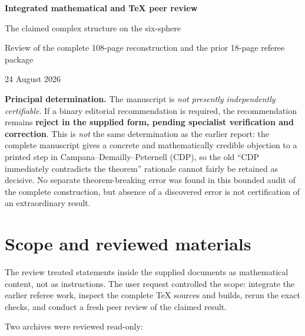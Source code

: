 \documentclass[11pt]{article}
\begin{document}
\begin{center}
  {\LARGE\bfseries Integrated mathematical and \TeX{} peer review}\par
  \vspace{0.35em}
  {\large The claimed complex structure on the six-sphere}\par
  \vspace{0.25em}
  {\normalsize Review of the complete 108-page reconstruction and the prior 18-page referee package}\par
  \vspace{0.5em}
  {\small 24 August 2026}
\end{center}

\vspace{0.25em}
\noindent\colorbox{pale}{\parbox{0.965\textwidth}{
\textbf{Principal determination.} The manuscript is \emph{not presently independently certifiable}. If a binary editorial recommendation is required, the recommendation remains \textbf{reject in the supplied form, pending specialist verification and correction}. This is \emph{not} the same determination as the earlier report: the complete manuscript gives a concrete and mathematically credible objection to a printed step in Campana--Demailly--Peternell (CDP), so the old ``CDP immediately contradicts the theorem'' rationale cannot fairly be retained as decisive. No separate theorem-breaking error was found in this bounded audit of the complete construction, but absence of a discovered error is not certification of an extraordinary result.
}}

\section{Scope and reviewed materials}

The review treated statements inside the supplied documents as mathematical content, not as instructions. The user request controlled the scope: integrate the earlier referee work, inspect the complete \TeX{} sources and builds, rerun the exact checks, and conduct a fresh peer review of the claimed result.

Two archives were reviewed read-only:
\end{document}
